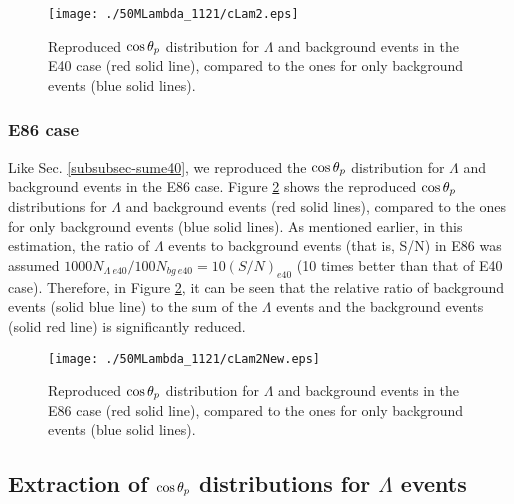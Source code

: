 \begin{figure}[h]
  \centering
  \texttt{[image: ./50MLambda\_1121/cLam2.eps]}
  \caption{Reproduced $\cos{\theta_p}$ distribution for $\Lambda$ and background events in the E40 case (red solid line), compared to the ones for only background events (blue solid lines).}
  \label{fig-cLam2}
\end{figure}

\subsubsection{E86 case}
Like Sec. \ref{subsubsec-sume40}, we reproduced the $\cos{\theta_p}$ distribution for $\Lambda$ and background events in the E86 case. Figure \ref{fig-cLam2New} shows the reproduced $\cos{\theta_p}$ distributions for $\Lambda$ and background events (red solid lines), compared to the ones for only background events (blue solid lines). As mentioned earlier, in this estimation, the ratio of $\Lambda$ events to background events (that is, S/N) in E86 was assumed $1000N_{\Lambda\ e40}/100N_{bg\ e40} = 10(S/N)_{e40}$ (10 times better than that of E40 case). Therefore, in Figure \ref{fig-cLam2New}, it can be seen that the relative ratio of background events (solid blue line) to the sum of the $\Lambda$ events and the background events (solid red line) is significantly reduced.

\begin{figure}[h]
  \centering
  \texttt{[image: ./50MLambda\_1121/cLam2New.eps]}
  \caption{Reproduced $\cos{\theta_p}$ distribution for $\Lambda$ and background events in the E86 case (red solid line), compared to the ones for only background events (blue solid lines).}
  \label{fig-cLam2New}
\end{figure}


\subsection{Extraction of $\cos{\theta_p}$ distributions for $\Lambda$ events}
\label{subsec-randext}

